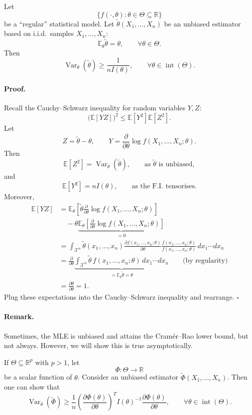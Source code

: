 \documentclass[11pt,a4paper]{article}
\begin{document}
Let
\[
\{f(\cdot,\theta):\theta\in\Theta\subseteq\mathbb{R}\}
\]
be a ``regular'' statistical model.
Let $\tilde{\theta}(X_1,\ldots,X_n)$ be an unbiased estimator based on
i.i.d.\ samples $X_1,\ldots,X_n$:
\[
\mathbb{E}_{\theta}\tilde{\theta}=\theta,
\qquad
\forall\theta\in\Theta.
\]
Then
\[
\operatorname{Var}_{\theta}(\tilde{\theta})
\geq
\frac{1}{nI(\theta)},
\qquad
\forall\theta\in\operatorname{int}(\Theta).
\]

\paragraph{Proof.}
Recall the Cauchy--Schwarz inequality for random variables $Y,Z$:
\[
\bigl(\mathbb{E}[YZ]\bigr)^2
\leq
\mathbb{E}[Y^2]\mathbb{E}[Z^2].
\]
Let
\[
Z=\tilde{\theta}-\theta,
\qquad
Y=\frac{\partial}{\partial\theta}
\log f(X_1,\ldots,X_n;\theta).
\]
Then
\[
\mathbb{E}[Z^2]
=
\operatorname{Var}_{\theta}(\tilde{\theta}),
\qquad
\text{as $\tilde{\theta}$ is unbiased},
\]
and
\[
\mathbb{E}[Y^2]
=
nI(\theta),
\qquad
\text{as the F.I.\ tensorises}.
\]
Moreover,
\[
\begin{aligned}
\mathbb{E}[YZ]
&=
\mathbb{E}_{\theta}
\left[
\tilde{\theta}
\frac{\partial}{\partial\theta}
\log f(X_1,\ldots,X_n;\theta)
\right]
\\
&\quad
-\theta
\underbrace{
\mathbb{E}_{\theta}
\left[
\frac{\partial}{\partial\theta}
\log f(X_1,\ldots,X_n;\theta)
\right]
}_{=0}
\\
&=
\int_{\mathcal{X}^n}
\tilde{\theta}(x_1,\ldots,x_n)
\frac{\partial f(x_1,\ldots,x_n;\theta)}{\partial\theta}
\frac{f(x_1,\ldots,x_n;\theta)}
     {f(x_1,\ldots,x_n;\theta)}
\,dx_1\cdots dx_n
\\
&=
\frac{\partial}{\partial\theta}
\underbrace{
\int_{\mathcal{X}^n}
\tilde{\theta}\,
f(x_1,\ldots,x_n;\theta)
\,dx_1\cdots dx_n
}_{=\mathbb{E}_{\theta}\tilde{\theta}=\theta}
\qquad
\text{(by regularity)}
\\
&=
\frac{\partial\theta}{\partial\theta}
=1.
\end{aligned}
\]
Plug these expectations into the Cauchy--Schwarz inequality and rearrange.
\hfill$\square$

\paragraph{Remark.}
Sometimes, the MLE is unbiased and attains the Cram\'er--Rao lower
bound, but not always. However, we will show this is true asymptotically.

If $\Theta\subseteq\mathbb{R}^p$ with $p>1$, let
\[
\Phi:\Theta\to\mathbb{R}
\]
be a scalar function of $\theta$.
Consider an unbiased estimator $\tilde{\Phi}(X_1,\ldots,X_n)$.
Then one can show that
\[
\operatorname{Var}_{\theta}(\tilde{\Phi})
\geq
\frac{1}{n}
\left(
\frac{\partial\Phi(\theta)}{\partial\theta}
\right)^{T}
I(\theta)^{-1}
\frac{\partial\Phi(\theta)}{\partial\theta},
\qquad
\forall\theta\in\operatorname{int}(\Theta).
\]
\end{document}
